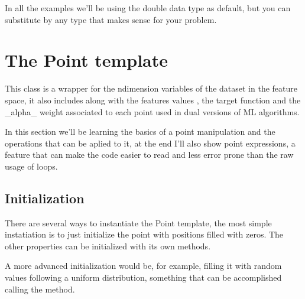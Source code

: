 \documentclass[letterpaper,10pt,english]{sphinxmanual}
\begin{document}
\sphinxAtStartPar
In all the examples we’ll be using the double data type as default, but you can substitute by any type that makes sense for your problem.


\section{The Point template}
\label{\detokenize{getting_started/datamanagement:the-point-template}}
\sphinxAtStartPar
This class is a wrapper for the n\sphinxhyphen{}dimension variables of the dataset in the feature space, it also includes
along with the features values , the target function  and the \_alpha\_ weight associated to each point used in dual versions of ML algorithms.

\sphinxAtStartPar
In this section we’ll be learning the basics of a point manipulation and the operations that can be aplied to it, at the end I’ll also show
point expressions, a feature that can make the code easier to read and less error prone than the raw usage of loops.


\subsection{Initialization}
\label{\detokenize{getting_started/datamanagement:initialization}}\label{\detokenize{getting_started/datamanagement:pointusage}}
\sphinxAtStartPar
There are several ways to instantiate the Point template, the most simple instatiation is to just initialize the point
with  positions filled with zeros. The other properties can be initialized with its own methods.

\begin{sphinxVerbatim}[commandchars=\\\{\}]
   
 

  
  
  
\end{sphinxVerbatim}

\sphinxAtStartPar
A more advanced initialization would be, for example, filling it with random values following a uniform distribution, something
that can be accomplished calling the  method.
\end{document}
